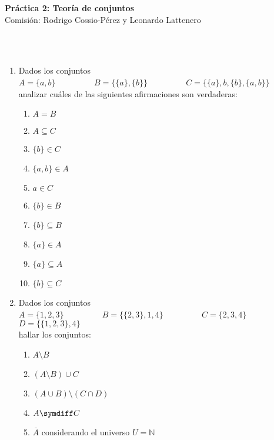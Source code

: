 \documentclass[a4paper]{article}
\newcommand{\exercise}{\item}
\newcommand{\intersec}{\cap}
\newcommand{\union}{\cup}
\newcommand{\compl}[1]{\overline{#1}}
\begin{document}
\noindent \hrulefill 
\vspace{-7pt}
\begin{center} 
	\textbf{ Práctica 2: Teoría de conjuntos} \\
	Comisión: Rodrigo Cossio-Pérez y Leonardo Lattenero
\end{center}
\vspace{-10pt}
\hrulefill \\
\phantom{~} \\
\begin{enumerate}
	\exercise Dados los conjuntos \\ $A=\{a,b\}$ ~~~~~~~~ $B=\{ \{a\}, \{b\} \}$ ~~~~~~~~ $C=\{ \{a\}, b, \{b\}, \{a,b\} \}$ \\ analizar cuáles de las siguientes afirmaciones son verdaderas:
	\begin{multicols}{3}
	\begin{enumerate} [label=(\alph*)]
		\item $A=B$
		\item $A \subseteq C$
		\item $\{b\} \in C$
		\item $\{a,b\} \in A$
		\item $a \in C$
		\item $\{b\} \in B$
		\item $\{b\} \subseteq B$
		\item $\{a\} \in A$
		\item $\{a\} \subseteq A$
		\item $\{b\} \subseteq C$
	\end{enumerate}
	\end{multicols}
	\exercise Dados los conjuntos \\ $A=\{1,2,3\}$ ~~~~~~~~ $B=\{ \{2,3\}, 1, 4\}$ ~~~~~~~~ $C=\{ 2,3,4 \}$ ~~~~~~~~ $D=\{ \{1,2,3\} ,4 \}$ \\ hallar los conjuntos: 
	\begin{multicols}{3}
	\begin{enumerate} [label=(\alph*)]
		\item $A\setminus B$
		\item $(A \setminus B) \union C$
		\item $(A \union B) \setminus (C \intersec D)$
		\item $A \symdiff C$
		\item $\compl{A}$ considerando el universo $U=\mathbb{N}$
	\end{enumerate}
	\end{multicols}

\end{enumerate}
\end{document}
